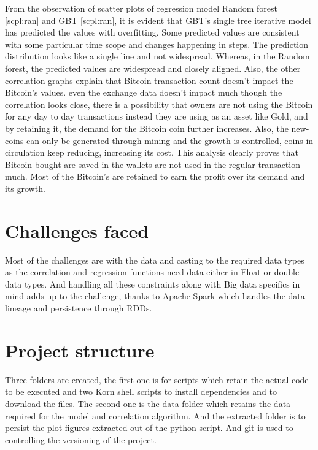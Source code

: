 \documentclass[sigconf]{acmart}
\begin{document}
From the observation of scatter plots of regression model Random forest \ref{scpl:ran} and GBT \ref{scpl:ran}, it is evident that GBT's single tree iterative model has predicted the values with overfitting. Some predicted values are consistent with some particular time scope and changes happening in steps. The prediction distribution looks like a single line and not widespread. Whereas, in the Random forest, the predicted values are widespread and closely aligned. Also, the other correlation graphs explain that Bitcoin transaction count doesn't impact the Bitcoin's values. even the exchange data doesn't impact much though the correlation looks close, there is a possibility that owners are not using the Bitcoin for any day to day transactions instead they are using as an asset like Gold, and by retaining it, the demand for the Bitcoin coin further increases. Also, the new-coins can only be generated through mining and the growth is controlled, coins in circulation keep reducing, increasing its cost.
This analysis clearly proves that Bitcoin bought are saved in the wallets are not used in the regular transaction much. Most of the Bitcoin's are retained to earn the profit over its demand and its growth.


\section{Challenges faced}
Most of the challenges are with the data and casting to the required data types as the correlation and regression functions need data either in Float or double data types. And handling all these constraints along with Big data specifics in mind adds up to the challenge, thanks to Apache Spark which handles the data lineage and persistence through RDDs.

\section{Project structure}
Three folders are created, the first one is for scripts which retain the actual code to be executed and two Korn shell scripts to install dependencies and to download the files. The second one is the data folder which retains the data required for the model and correlation algorithm. And the extracted folder is to persist the plot figures extracted out of the python script. And git is used to controlling the versioning of the project. 
\end{document}
